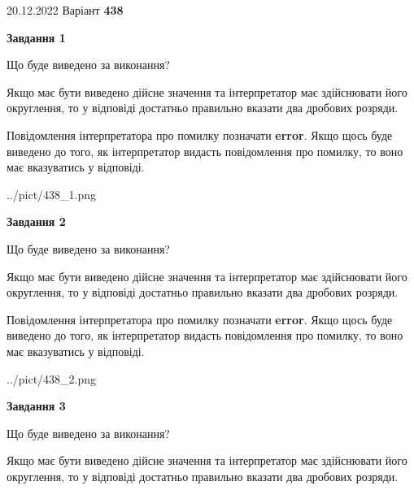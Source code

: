 \documentclass[12pt, ukrainian]{article}
\begin{document}
{20.12.2022 Варіант \No \textbf { 438 }\par}
{
\begin {Large}

{\begin {center}\textbf{Завдання 1}\end {center}}\par
Що буде виведено за виконання? \par

Якщо має бути виведено дійсне значення та інтерпретатор має здійснювати його округлення, 
то у відповіді достатньо правильно вказати два дробових розряди.

Повідомлення інтерпретатора про помилку позначати \textbf{error}.
Якщо щось буде виведено до того, як інтерпретатор видасть повідомлення про помилку, 
то воно має вказуватись у відповіді. \par

\begin{center}
	{../pict/438_1.png}
\end{center}
\newpage

{\begin {center}\textbf{Завдання 2}\end {center}}\par
Що буде виведено за виконання? \par

Якщо має бути виведено дійсне значення та інтерпретатор має здійснювати його округлення, 
то у відповіді достатньо правильно вказати два дробових розряди.

Повідомлення інтерпретатора про помилку позначати \textbf{error}.
Якщо щось буде виведено до того, як інтерпретатор видасть повідомлення про помилку, 
то воно має вказуватись у відповіді. \par

\begin{center}
	{../pict/438_2.png}
\end{center}
\newpage

{\begin {center}\textbf{Завдання 3}\end {center}}\par
Що буде виведено за виконання? \par

Якщо має бути виведено дійсне значення та інтерпретатор має здійснювати його округлення, 
то у відповіді достатньо правильно вказати два дробових розряди.


\end{Large}}
\end{document}
